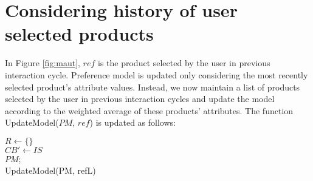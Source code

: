 \section{Considering history of user selected products}
In Figure \ref{fig:maut}, $ref$ is the product selected by the user in previous interaction cycle.
Preference model is updated only considering the most recently selected product's attribute values.
Instead, we now maintain a list of products selected by the user in previous interaction cycles and update the model according to the weighted average of these products' attributes.
The function UpdateModel($PM$, $ref$) is updated as follows:



\begin{algorithm}[ht]
  \DontPrintSemicolon

  $R \gets \{\}$\\
  $CB' \gets IS$\\
  \Return $PM$;\\

  \caption{UpdateModel(PM, refL)}
  \label{algo:history}
\end{algorithm}
